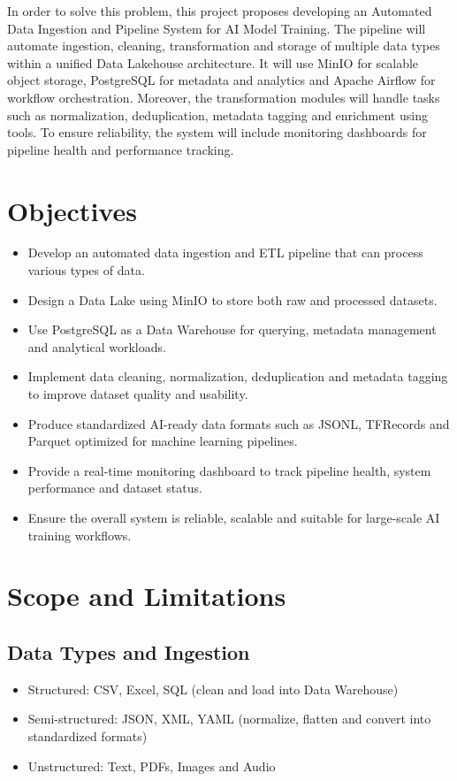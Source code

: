 \documentclass[12pt,oneside,openright,a4paper]{cpe-english-project}
\begin{document}
In order to solve this problem, this project proposes developing an Automated Data Ingestion and Pipeline System for AI Model Training. The pipeline will automate ingestion, cleaning, transformation and storage of multiple data types within a unified Data Lakehouse architecture. It will use MinIO for scalable object storage, PostgreSQL for metadata and analytics and Apache Airflow for workflow orchestration. Moreover, the transformation modules will handle tasks such as normalization, deduplication, metadata tagging and enrichment using tools. To ensure reliability, the system will include monitoring dashboards for pipeline health and performance tracking.

\section{Objectives}

\begin{itemize}
\item Develop an automated data ingestion and ETL pipeline that can process various types of data.
\item Design a Data Lake using MinIO to store both raw and processed datasets.
\item Use PostgreSQL as a Data Warehouse for querying, metadata management and analytical workloads.
\item Implement data cleaning, normalization, deduplication and metadata tagging to improve dataset quality and usability.
\item Produce standardized AI-ready data formats such as JSONL, TFRecords and Parquet optimized for machine learning pipelines.
\item Provide a real-time monitoring dashboard to track pipeline health, system performance and dataset status.
\item Ensure the overall system is reliable, scalable and suitable for large-scale AI training workflows.
\end{itemize}

\section{Scope and Limitations}

\subsection{Data Types and Ingestion}
\begin{itemize}
\item Structured: CSV, Excel, SQL (clean and load into Data Warehouse)
\item Semi-structured: JSON, XML, YAML (normalize, flatten and convert into standardized formats)
\item Unstructured: Text, PDFs, Images and Audio
\end{itemize}
\end{document}
